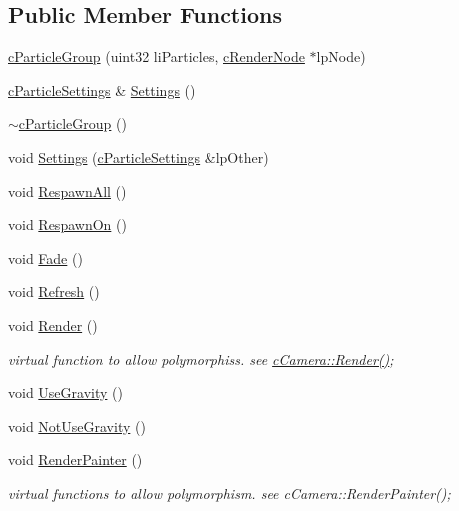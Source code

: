 \subsection*{Public Member Functions}
\begin{DoxyCompactItemize}
\item 
\hyperlink{classc_particle_group_a58e192e10ae42dad02ae19503e704fca}{cParticleGroup} (uint32 liParticles, \hyperlink{classc_render_node}{cRenderNode} $\ast$lpNode)
\item 
\hyperlink{classc_particle_settings}{cParticleSettings} \& \hyperlink{classc_particle_group_abe812ea1ef5aafe70db9b27bce344adb}{Settings} ()
\item 
\hyperlink{classc_particle_group_a5aa56f2eeb17bc37243b09a20d7c88d5}{$\sim$cParticleGroup} ()
\item 
void \hyperlink{classc_particle_group_adb43a187ed534477a69be1d6e76f478d}{Settings} (\hyperlink{classc_particle_settings}{cParticleSettings} \&lpOther)
\item 
void \hyperlink{classc_particle_group_aa86c4f62db0d6f533059680484d3b08f}{RespawnAll} ()
\item 
void \hyperlink{classc_particle_group_a596405077186bbc0bb5313ca33d44a49}{RespawnOn} ()
\item 
void \hyperlink{classc_particle_group_a38986ec8be6094851b3d0a0d52f88d3c}{Fade} ()
\item 
void \hyperlink{classc_particle_group_a2f4e6ae1f6c0755dd3d53915322a4b00}{Refresh} ()
\item 
void \hyperlink{classc_particle_group_a9b4bf815002fe5c480d93bc0a81e879c}{Render} ()
\begin{DoxyCompactList}\small\item\em virtual function to allow polymorphiss. see \hyperlink{classc_camera_acfe96d0953540fa3938e4d415d7cb791}{cCamera::Render()}; \item\end{DoxyCompactList}\item 
void \hyperlink{classc_particle_group_a2434c8be6ed61ef272b10f38ec74dcbc}{UseGravity} ()
\item 
void \hyperlink{classc_particle_group_a3c02536519f3470269865d81c74c4691}{NotUseGravity} ()
\item 
void \hyperlink{classc_particle_group_a9f825be2f03920ca17cabcfbd6db47d6}{RenderPainter} ()
\begin{DoxyCompactList}\small\item\em virtual functions to allow polymorphism. see cCamera::RenderPainter(); \item\end{DoxyCompactList}\item 

\end{DoxyCompactItemize}
